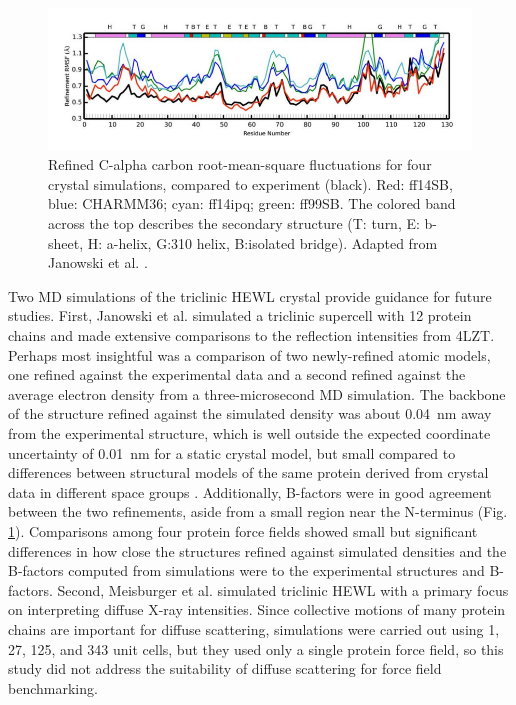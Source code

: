 \documentclass[9pt,review]{livecoms}
\begin{document}
\begin{figure}[t]
    \centering
    \label{fig:hewl-xtal-rmsf}
    \includegraphics[width=\linewidth]{paper/figures/janowski-2016-fig-4c.pdf}
    \caption{
        Refined C-alpha carbon root-mean-square fluctuations for four crystal simulations, compared to experiment (black).
        Red: ff14SB, blue: CHARMM36; cyan: ff14ipq; green: ff99SB. 
        The colored band across the top describes the secondary structure (T: turn, E: b-sheet, H: a-helix, G:310 helix, B:isolated bridge).
        Adapted from Janowski et al. \cite{janowski_molecular_2016}.
    }
\end{figure}

Two MD simulations of the triclinic HEWL crystal provide guidance for future studies.
First, Janowski et al. \cite{janowski_molecular_2016} simulated a triclinic supercell with 12 protein chains and made extensive comparisons to the reflection intensities from 4LZT.
Perhaps most insightful was a comparison of two newly-refined atomic models, one refined against the experimental data and a second refined against the average electron density from a three-microsecond MD simulation.
The backbone of the structure refined against the simulated density was about \qty{0.04}{\nano\meter} away from the experimental structure, which is well outside the expected coordinate uncertainty of \qty{0.01}{\nano\meter} for a static crystal model, but small compared to differences between structural models of the same protein derived from crystal data in different space groups \cite{kovalevskiy_alphafold_2024}.
Additionally, B-factors were in good agreement between the two refinements, aside from a small region near the N-terminus (Fig. \ref{fig:hewl-xtal-rmsf}).
Comparisons among four protein force fields showed small but significant differences in how close the structures refined against simulated densities and the B-factors computed from simulations were to the experimental structures and B-factors.
Second, Meisburger et al. \cite{meisburger_diffuse_2020} simulated triclinic HEWL with a primary focus on interpreting diffuse X-ray intensities.
Since collective motions of many protein chains are important for diffuse scattering, simulations were carried out using 1, 27, 125, and 343 unit cells, but they used only a single protein force field, so this study did not address the suitability of diffuse scattering for force field benchmarking.
\end{document}

